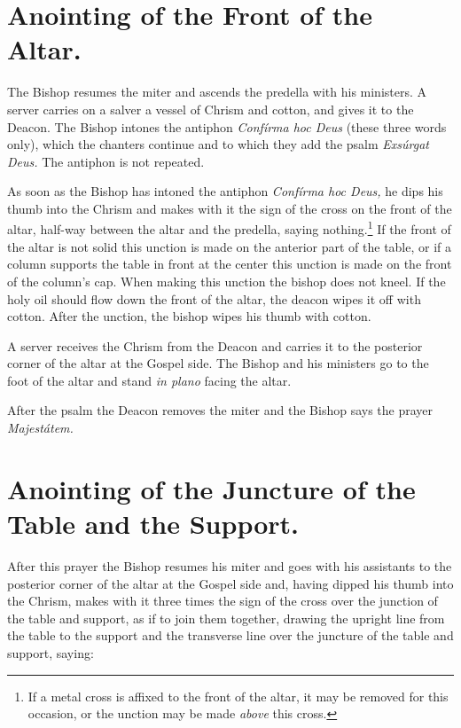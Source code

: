 \documentclass[letterpaper]{report}
\begin{document}
{    \section{Anointing of the Front of the Altar.}

    \rubric The Bishop resumes the miter and ascends the predella with his
    ministers. A server carries on a salver a vessel of Chrism and cotton, and
    gives it to the Deacon. The Bishop intones the antiphon \textit{Confírma
    hoc Deus} (these three words only), which the chanters continue and to
    which they add the psalm \textit{Exsúrgat Deus.} The antiphon is not
    repeated.

    \rubric As soon as the Bishop has intoned the antiphon \textit{Confírma hoc
    Deus,} he dips his thumb into the Chrism and makes with it the sign of the
    cross on the front of the altar, half-way between the altar and the
    predella, saying nothing.\footnote{If a metal cross is affixed to the front
    of the altar, it may be removed for this occasion, or the unction may be
    made \textit{above} this cross.} If the front of the altar is not solid
    this unction is made on the anterior part of the table, or if a column
    supports the table in front at the center this unction is made on the front
    of the column's cap. When making this unction the bishop does not kneel. If
    the holy oil should flow down the front of the altar, the deacon wipes it
    off with cotton. After the unction, the bishop wipes his thumb with cotton.

    \rubric A server receives the Chrism from the Deacon and carries it to the
    posterior corner of the altar at the Gospel side. The Bishop and his
    ministers go to the foot of the altar and stand \textit{in plano} facing
    the altar.

    After the psalm the Deacon removes the miter and the Bishop says the prayer
    \textit{Majestátem.}

    \section{Anointing of the Juncture of the Table and the Support.}

    \rubric After this prayer the Bishop resumes his miter and goes with his
    assistants to the posterior corner of the altar at the Gospel side and,
    having dipped his thumb into the Chrism, makes with it three times the sign
    of the cross over the junction of the table and support, as if to join them
    together, drawing the upright line from the table to the support and the
    transverse line over the juncture of the table and support, saying:

}
\end{document}
